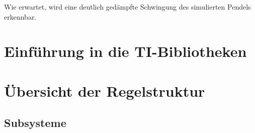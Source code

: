 Wie erwartet, wird eine deutlich gedämpfte Schwingung des simulierten Pendels erkennbar.

\section{Einführung in die TI-Bibliotheken}\label{sec:TI}

\section{Übersicht der Regelstruktur}\label{sec:ueberregelung}

\subsection{Subsysteme}





